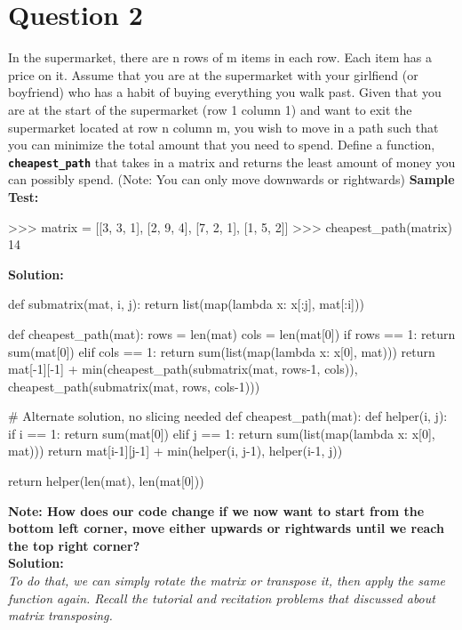 \section{Question 2}
In the supermarket, there are n rows of m items in each row. Each item has a price
on it. Assume that you are at the supermarket with your girlfiend (or boyfriend) who has a habit of
buying everything you walk past. Given that you are at the start of the supermarket (row
1 column 1) and want to exit the supermarket located at row n column m, you wish to move in a
path such that you can minimize the total amount that you need to spend. Define a
function, \texttt{\bfseries cheapest\_path} that takes in a matrix and returns the least amount of
money you can possibly spend. (Note: You can only move downwards or rightwards)
\textbf{Sample Test:}
\begin{python}
>>> matrix = [[3, 3, 1],
              [2, 9, 4],
              [7, 2, 1],
              [1, 5, 2]]
>>> cheapest_path(matrix)
14
\end{python}
\textbf{Solution:}
\begin{python}
def submatrix(mat, i, j):
    return list(map(lambda x: x[:j], mat[:i]))

def cheapest_path(mat):
    rows = len(mat)
    cols = len(mat[0])
    if rows == 1:
        return sum(mat[0])
    elif cols == 1:
        return sum(list(map(lambda x: x[0], mat)))
    return mat[-1][-1] + min(cheapest_path(submatrix(mat, rows-1, cols)),
                             cheapest_path(submatrix(mat, rows, cols-1)))

# Alternate solution, no slicing needed
def cheapest_path(mat):
    def helper(i, j):
        if i == 1:
            return sum(mat[0])
        elif j == 1:
            return sum(list(map(lambda x: x[0], mat)))
        return mat[i-1][j-1] + min(helper(i, j-1), helper(i-1, j))

    return helper(len(mat), len(mat[0]))
\end{python}

\textbf{Note: How does our code change if we now want to start from the bottom left
corner, move either upwards or rightwards until we reach the top right corner?} \\
\textbf{Solution:} \\
\textit{To do that, we can simply rotate the matrix or transpose it, then apply the 
same function again. Recall the tutorial and recitation problems that discussed 
about matrix transposing.}

